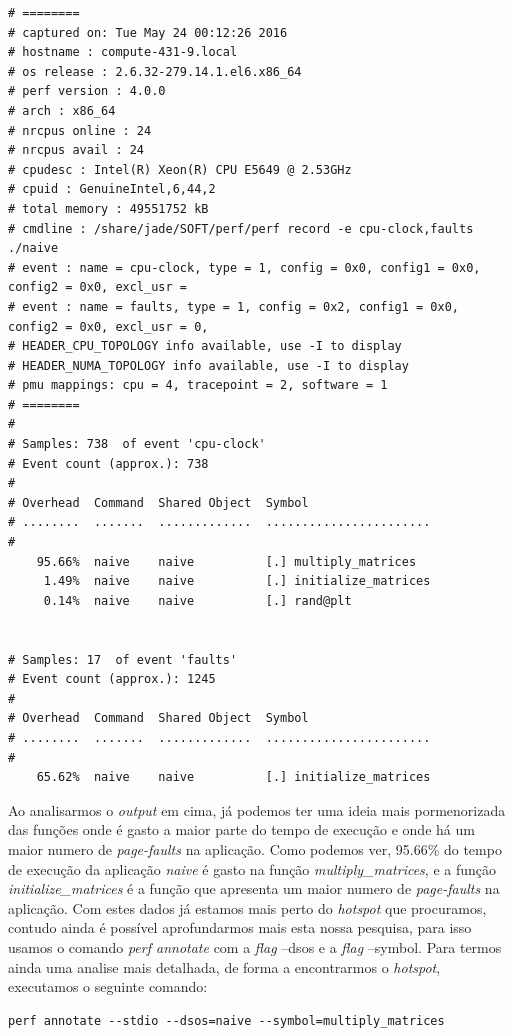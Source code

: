 \documentclass[conference,compsoc]{IEEEtran}
\begin{document}
\begin{lstlisting}
# ========
# captured on: Tue May 24 00:12:26 2016
# hostname : compute-431-9.local
# os release : 2.6.32-279.14.1.el6.x86_64
# perf version : 4.0.0
# arch : x86_64
# nrcpus online : 24
# nrcpus avail : 24
# cpudesc : Intel(R) Xeon(R) CPU E5649 @ 2.53GHz
# cpuid : GenuineIntel,6,44,2
# total memory : 49551752 kB
# cmdline : /share/jade/SOFT/perf/perf record -e cpu-clock,faults ./naive 
# event : name = cpu-clock, type = 1, config = 0x0, config1 = 0x0, config2 = 0x0, excl_usr =
# event : name = faults, type = 1, config = 0x2, config1 = 0x0, config2 = 0x0, excl_usr = 0,
# HEADER_CPU_TOPOLOGY info available, use -I to display
# HEADER_NUMA_TOPOLOGY info available, use -I to display
# pmu mappings: cpu = 4, tracepoint = 2, software = 1
# ========
#
# Samples: 738  of event 'cpu-clock'
# Event count (approx.): 738
#
# Overhead  Command  Shared Object  Symbol                 
# ........  .......  .............  .......................
#
    95.66%  naive    naive          [.] multiply_matrices  
     1.49%  naive    naive          [.] initialize_matrices
     0.14%  naive    naive          [.] rand@plt           


# Samples: 17  of event 'faults'
# Event count (approx.): 1245
#
# Overhead  Command  Shared Object  Symbol                 
# ........  .......  .............  .......................
#
    65.62%  naive    naive          [.] initialize_matrices 
\end{lstlisting}

Ao analisarmos o \textit{output} em cima, já podemos ter uma ideia mais pormenorizada das funções onde é gasto a maior parte do tempo de execução e onde há um maior numero de \textit{page-faults} na aplicação. Como podemos ver, 95.66\% do tempo de execução da aplicação \textit{naive} é gasto na função \textit{multiply\_matrices}, e a função \textit{initialize\_matrices} é a função que apresenta um maior numero de \textit{page-faults} na aplicação. Com estes dados já estamos mais perto do \textit{hotspot} que procuramos, contudo ainda é possível aprofundarmos mais esta nossa pesquisa, para isso usamos o comando \textit{perf annotate} com a \textit{flag} --dsos e a \textit{flag} --symbol.
Para termos ainda uma analise mais detalhada, de forma a encontrarmos o \textit{hotspot}, executamos o seguinte comando:

\begin{lstlisting}
perf annotate --stdio --dsos=naive --symbol=multiply_matrices
\end{lstlisting}
\end{document}
